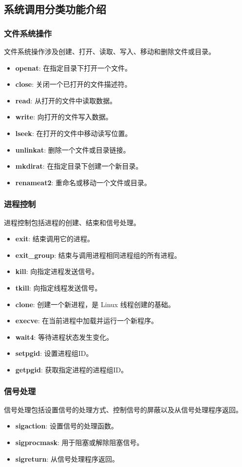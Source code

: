 \subsection{系统调用分类功能介绍}
\subsubsection*{文件系统操作}
文件系统操作涉及创建、打开、读取、写入、移动和删除文件或目录。
\begin{itemize}
    \item \textbf{openat}: 在指定目录下打开一个文件。
    \item \textbf{close}: 关闭一个已打开的文件描述符。
    \item \textbf{read}: 从打开的文件中读取数据。
    \item \textbf{write}: 向打开的文件写入数据。
    \item \textbf{lseek}: 在打开的文件中移动读写位置。
    \item \textbf{unlinkat}: 删除一个文件或目录链接。
    \item \textbf{mkdirat}: 在指定目录下创建一个新目录。
    \item \textbf{renameat2}: 重命名或移动一个文件或目录。
\end{itemize}
\subsubsection*{进程控制}
进程控制包括进程的创建、结束和信号处理。
\begin{itemize}
    \item \textbf{exit}: 结束调用它的进程。
    \item \textbf{exit\_group}: 结束与调用进程相同进程组的所有进程。
    \item \textbf{kill}: 向指定进程发送信号。
    \item \textbf{tkill}: 向指定线程发送信号。
    \item \textbf{clone}: 创建一个新进程，是 Linux 线程创建的基础。
    \item \textbf{execve}: 在当前进程中加载并运行一个新程序。
    \item \textbf{wait4}: 等待进程状态发生变化。
    \item \textbf{setpgid}: 设置进程组ID。
    \item \textbf{getpgid}: 获取指定进程的进程组ID。
\end{itemize}
\subsubsection{信号处理}
信号处理包括设置信号的处理方式、控制信号的屏蔽以及从信号处理程序返回。
\begin{itemize}
    \item \textbf{sigaction}: 设置信号的处理函数。
    \item \textbf{sigprocmask}: 用于阻塞或解除阻塞信号。
    \item \textbf{sigreturn}: 从信号处理程序返回。
\end{itemize}
